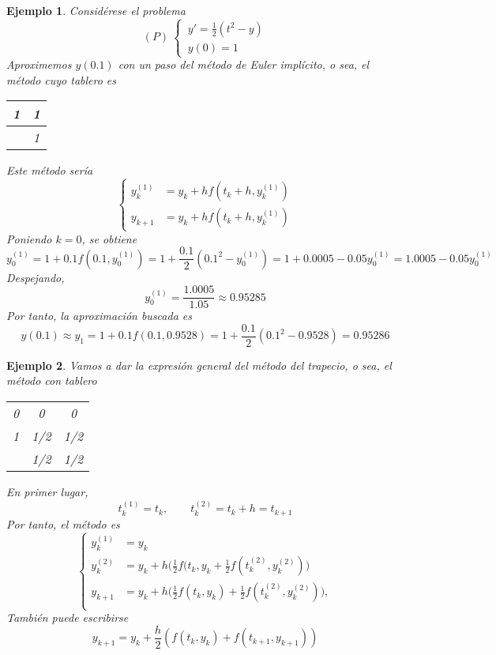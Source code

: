 \documentclass[11pt]{report}
\theoremstyle{mytheorem}
\theoremstyle{mydefinition}
\theoremstyle{myexample}
\newtheorem*{example}{Ejemplo}
\begin{document}
\begin{example}
Considérese el problema
\[(P) \ \begin{cases}
\, y' =\frac{1}{2}(t^2-y) \\
\,   y(0)=1\end{cases}\]
Aproximemos $y(0.1)$ con un paso del \emph{método de Euler implícito}, o sea, el método cuyo tablero es

\begin{center}
\setlength\extrarowheight{2.5pt}
\begin{tabular}{c|c}
    1 & 1\\ \hline
    & 1
\end{tabular}
\end{center}
Este método sería
\[\left\{\begin{alignedat}{1}
    y_k^{(1)} &= y_k+hf(t_k+h,y_k^{(1)}) \\
    y_{k+1} &= y_k+hf(t_k+h,y_k^{(1)})
\end{alignedat}\right.\]
Poniendo $k=0$, se obtiene
\[y_0^{(1)} = 1+0.1f(0.1,y_0^{(1)}) = 1+\frac{0.1}{2}(0.1^2-y_0^{(1)}) = 1+0.0005-0.05y_0^{(1)} = 1.0005-0.05y_0^{(1)}\]
Despejando,
\[y_0^{(1)} = \frac{1.0005}{1.05} \approx 0.95285\]
Por tanto, la aproximación buscada es
\[y(0.1) \approx y_1 = 1+0.1f(0.1,0.9528) = 1+\frac{0.1}{2}(0.1^2-0.9528) = 0.95286\]
\end{example}

\begin{example}
Vamos a dar la expresión general del \emph{método del trapecio}, o sea, el método con tablero

\begin{center}
\setlength\extrarowheight{2.5pt}
\begin{tabular}{c|cc}
    0 & 0 & 0 \\
    1 & 1/2 & 1/2 \\ \hline
    & 1/2 & 1/2
\end{tabular}
\end{center}
En primer lugar,
\[t_k^{(1)} = t_k, \qquad t_k^{(2)} = t_k+h = t_{k+1}\]
Por tanto, el método es
\[\left\{\begin{alignedat}{1}
    y_k^{(1)} &= y_k \phantom{\frac{1}{1}} \\[5pt]
    y_k^{(2)} &= y_k + h\bigl(\frac{1}{2}f(t_k,y_k+\frac{1}{2}f(t_k^{(2)},y_k^{(2)})\bigr)\\[5pt]
    y_{k+1} &= y_k+h\bigl(\frac{1}{2}f(t_k,y_k)+\frac{1}{2}f(t_k^{(2)},y_k^{(2)})\bigr), \\[5pt]
\end{alignedat}\right.\]
También puede escribirse
\[y_{k+1} = y_k+\frac{h}{2}(f(t_k,y_k)+f(t_{k+1},y_{k+1}))\]
\end{example}
\end{document}
